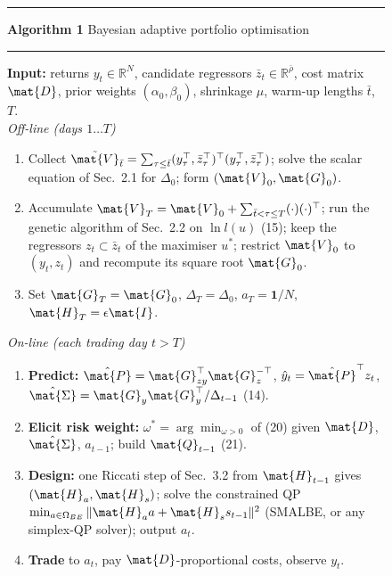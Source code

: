 \begin{figure}[ht!]
\begin{minipage}{\columnwidth}
\noindent\rule{\linewidth}{0.6pt}\par\vspace{2pt}
\noindent\textbf{Algorithm 1} Bayesian adaptive portfolio optimisation\par
\noindent\rule{\linewidth}{0.4pt}\par\vspace{2pt}
\noindent\textbf{Input:} returns $y_t\in\mathbb{R}^N$, candidate regressors $\bar{z}_t\in\mathbb{R}^{\bar\rho}$, cost matrix $\mat{D}$, prior weights $(\alpha_0,\beta_0)$, shrinkage $\mu$, warm-up lengths $\bar{t}$, $T$.\\[2pt]
\noindent\emph{Off-line (days $1\ldots T$)}
\begin{enumerate}\setlength{\itemsep}{0pt}
\item Collect $\tilde{\mat{V}}_{\bar t}=\sum_{\tau\le\bar t}(y_\tau^\top,\bar z_\tau^\top)^\top(y_\tau^\top,\bar z_\tau^\top)$; solve the scalar equation of Sec.~2.1 for $\Delta_0$; form $(\mat{V}_0,\mat{G}_0)$.
\item Accumulate $\mat{V}_T=\mat{V}_0+\sum_{\bar t<\tau\le T}(\cdot)(\cdot)^\top$; run the genetic algorithm of Sec.~2.2 on $\ln l(u)$ (15); keep the regressors $z_t\subset\bar z_t$ of the maximiser $u^*$; restrict $\mat{V}_0$ to $(y_t,z_t)$ and recompute its square root $\mat{G}_0$.
\item Set $\mat{G}_T=\mat{G}_0$, $\Delta_T=\Delta_0$, $a_T=\mathbf{1}/N$, $\mat{H}_T=\epsilon\mat{I}$.
\end{enumerate}
\noindent\emph{On-line (each trading day $t>T$)}
\begin{enumerate}\setlength{\itemsep}{0pt}\setcounter{enumi}{3}
\item \textbf{Predict:} $\hat{\mat{P}}=\mat{G}_{zy}^\top\mat{G}_{z}^{-\top}$, $\hat y_t=\hat{\mat{P}}^\top z_t$, $\hat{\mat{\Sigma}}=\mat{G}_y\mat{G}_y^\top/\Delta_{t-1}$ (14).
\item \textbf{Elicit risk weight:} $\omega^*=\arg\min_{\omega>0}$ of (20) given $\mat{D}$, $\hat{\mat{\Sigma}}$, $a_{t-1}$; build $\mat{Q}_{t-1}$ (21).
\item \textbf{Design:} one Riccati step of Sec.~3.2 from $\mat{H}_{t-1}$ gives $(\mat{H}_a,\mat{H}_s)$; solve the constrained QP $\min_{a\in\Omega_{BE}}\|\mat{H}_a a+\mat{H}_s s_{t-1}\|^2$ (SMALBE, or any simplex-QP solver); output $a_t$.
\item \textbf{Trade} to $a_t$, pay $\mat{D}$-proportional costs, observe $y_t$.

\end{enumerate}
\end{minipage}
\end{figure}
